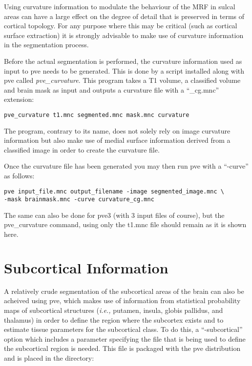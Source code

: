 \documentclass{article}
\begin{document}
Using curvature information to modulate the behaviour of the MRF in
sulcal areas can have a large effect on the degree of detail
that is preserved in terms of cortical topology.  For any purpose
where this may be critical (such as cortical surface extraction) it
is strongly advisable to make use of curvature information in the
segmentation process.

Before the actual segmentation is performed, the curvature information used
as input to pve needs to be generated.  This is done by a script installed
along with pve called \textit{pve\_curvature}.  This program takes a T1 volume,
a classified volume and brain mask as input and outputs a curvature file with a
``\_cg.mnc'' extension:

\begin{verbatim}
pve_curvature t1.mnc segmented.mnc mask.mnc curvature
\end{verbatim}

The program, contrary to its name, does not solely rely on image curvature
information but also make use of medial surface information derived from
a classified image in order to create the curvature file.

Once the curvature file has been generated you may then run pve with a ``-curve'' as
follows:

\begin{verbatim}
pve input_file.mnc output_filename -image segmented_image.mnc \ 
-mask brainmask.mnc -curve curvature_cg.mnc
\end{verbatim}

The same can also be done for pve3 (with 3 input files of course), but the pve\_curvature 
command, using only the t1.mnc file should remain as it is shown here.

\section{Subcortical Information}

A relatively crude segmentation of the subcortical areas of the brain can also be acheived
using pve, which makes use of information from statistical probability maps of subcortical 
structures (\textit{i.e.,} putamen, insula, globis pallidus, and thalamus) in order to
define the region where the subcortex exists and to estimate tissue parameters for the 
subcortical class.  To do this, a ``-subcortical'' option which includes a parameter
specifying the file that is being used to define the subcortical region is needed.  This
file is packaged with the pve distribution and is placed in the directory:
\end{document}
